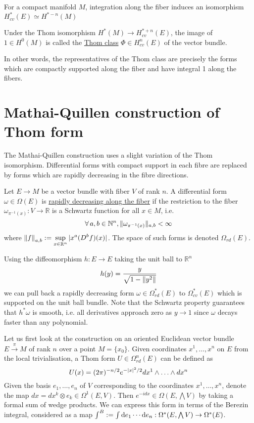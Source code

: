 \begin{thm} %
	For a compact manifold $M$,
	integration along the fiber induces an isomorphism
	 $H^*_{cv}(E) \simeq H^{*-n}(M)$
\end{thm}
\begin{defn}
	Under the Thom isomorphism $H^*(M)\to H_{cv}^{*+n}(E)$, the
	image of $1\in H^0(M)$ is called the \underline{Thom class}  $\Phi\in
	H_{cv}^n(E)$ of the vector bundle.
\end{defn}
In other words, the representatives of the Thom class are precisely the forms
which are compactly supported along the fiber and have integral 1 along the
fibers.


\section{Mathai-Quillen construction of Thom form}
\label{section:mq_formula}
The Mathai-Quillen construction uses a slight variation of the Thom isomorphism.
Differential forms with compact support in each fibre are replaced by forms
which are rapidly decreasing in the fibre directions. 

\begin{defn}
	Let $E\to M$ be a vector bundle with fiber  $V$ of rank  $n$.
	A differential form $\omega\in \Omega(E)$ is \underline{rapidly decreasing
	along the fiber} if the restriction to the fiber 
	$\omega_{\pi^{-1}(x)} : V \to \mathbb{R}$ is a Schwartz function for all $x\in M$,
	i.e.
	 \[
		 \fall a,b \in \mathbb{N}^n, \norm[*]{\omega_{\pi^{-1}(x)}}_{a,b} < \infty
	\] 
	where $\displaystyle \norm{f}_{a,b} := \sup_{x\in \mathbb{R}^n}\abs[*]{x^a(D^bf)(x)}$.
	The space of such forms is denoted $\Omega_{rd}(E)$.
\end{defn}

\vspace{-1ex}
Using the diffeomorphism $h : E \to E$ taking the unit ball to $\mathbb{R}^n$
\[
	h(y) = \frac{y}{\sqrt{1-\norm{y^2}} }
\] 
we can pull back a rapidly decreasing form $\omega\in \Omega_{rd}^*(E)$ to 
$\Omega_{cv}^*(E)$ which is supported on the unit ball bundle. 
Note that the Schwartz property guarantees that $h^*\omega$ is smooth, i.e. 
all derivatives approach zero as $y \to 1$ since $\omega$ decays faster than any
polynomial.


Let us first look at the construction on an oriented Euclidean vector bundle
$E\xrightarrow{\pi} M$ of rank $n$ over a point $M=\{x_0\}$. 
Given coordinates $x^1,\ldots,x^n$ on $E$ from the local trivialisation,
a Thom form $U\in \Omega^n_{rd}(E)$ can be defined as
\[
	U(x) = (2\pi)^{-n/2}e^{-\abs{x}^2 /2} dx^1\wedge \ldots\wedge dx^n
\] 
Given the basis $e_1,\ldots,e_n$ of  $V$ corresponding to the coordinates
$x^1,\ldots,x^n$, denote the map $dx = dx^k \otimes e_k \in 
\Omega^1(E, V)$. Then $e^{-idx}\in \Omega(E,\bigwedge V)$ by taking a formal sum
of wedge products.
We can express this form in terms of the Berezin integral,
considered as a map $\int^B := \int \odif{e_1}\cdots\odif{e_n} 
: \Omega^*(E,\bigwedge V) \to \Omega^*(E)$.

